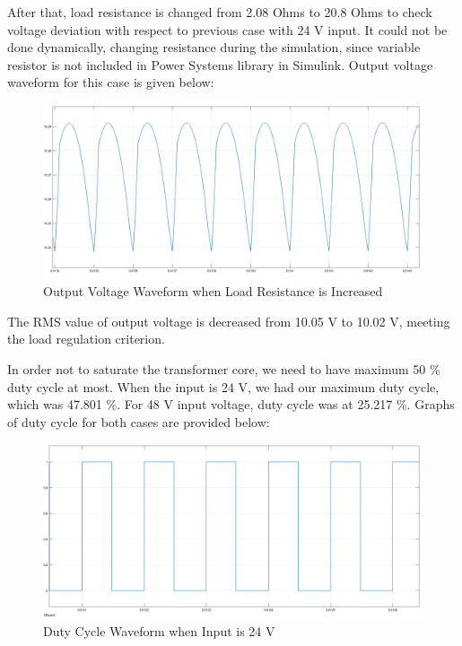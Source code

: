 \documentclass{article}
\newcommand\tab[1][1cm]{\hspace*{#1}}
\begin{document}
\tab After that, load resistance is changed from 2.08 Ohms to 20.8 Ohms to check voltage deviation with respect to previous case with 24 V input. It could not be done dynamically, changing resistance during the simulation, since variable resistor is not included in Power Systems library in Simulink. Output voltage waveform for this case is given below:
\begin{figure}[H]
    \centering
    \includegraphics[scale=0.2]{24v_output with higher load.png}
    \caption{Output Voltage Waveform when Load Resistance is Increased}
    \label{fig:my_label}
\end{figure}

The RMS value of output voltage is decreased from 10.05 V to 10.02 V, meeting the load regulation criterion.

\tab In order not to saturate the transformer core, we need to have maximum 50 \% duty cycle at most. When the input is 24 V, we had our maximum duty cycle, which was 47.801 \%. For 48 V input voltage, duty cycle was at 25.217 \%. Graphs of duty cycle for both cases are provided below:
\begin{figure}[H]
    \centering
    \includegraphics[scale=0.2]{24v_duty.png}
    \caption{Duty Cycle Waveform when Input is 24 V}
    \label{fig:my_label}
\end{figure}
\end{document}
